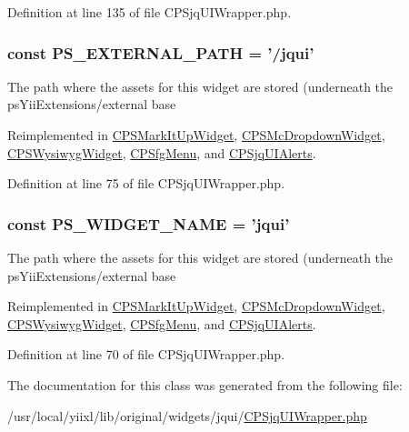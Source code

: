 Definition at line 135 of file CPSjqUIWrapper.php.

\hypertarget{classCPSjqUIWrapper_a8ccb5e1d65c091f944a6aa8c5be834ca}{
\subsubsection[{PS\_\-EXTERNAL\_\-PATH}]{\setlength{\rightskip}{0pt plus 5cm}const {\bf PS\_\-EXTERNAL\_\-PATH} = '/jqui'}}
\label{classCPSjqUIWrapper_a8ccb5e1d65c091f944a6aa8c5be834ca}
The path where the assets for this widget are stored (underneath the psYiiExtensions/external base 

Reimplemented in \hyperlink{classCPSMarkItUpWidget_a8ccb5e1d65c091f944a6aa8c5be834ca}{CPSMarkItUpWidget}, \hyperlink{classCPSMcDropdownWidget_a8ccb5e1d65c091f944a6aa8c5be834ca}{CPSMcDropdownWidget}, \hyperlink{classCPSWysiwygWidget_a8ccb5e1d65c091f944a6aa8c5be834ca}{CPSWysiwygWidget}, \hyperlink{classCPSfgMenu_a8ccb5e1d65c091f944a6aa8c5be834ca}{CPSfgMenu}, and \hyperlink{classCPSjqUIAlerts_a8ccb5e1d65c091f944a6aa8c5be834ca}{CPSjqUIAlerts}.



Definition at line 75 of file CPSjqUIWrapper.php.

\hypertarget{classCPSjqUIWrapper_ae357f9dc377f7de0d12010b2ced28cbc}{
\subsubsection[{PS\_\-WIDGET\_\-NAME}]{\setlength{\rightskip}{0pt plus 5cm}const {\bf PS\_\-WIDGET\_\-NAME} = 'jqui'}}
\label{classCPSjqUIWrapper_ae357f9dc377f7de0d12010b2ced28cbc}
The path where the assets for this widget are stored (underneath the psYiiExtensions/external base 

Reimplemented in \hyperlink{classCPSMarkItUpWidget_ae357f9dc377f7de0d12010b2ced28cbc}{CPSMarkItUpWidget}, \hyperlink{classCPSMcDropdownWidget_ae357f9dc377f7de0d12010b2ced28cbc}{CPSMcDropdownWidget}, \hyperlink{classCPSWysiwygWidget_ae357f9dc377f7de0d12010b2ced28cbc}{CPSWysiwygWidget}, \hyperlink{classCPSfgMenu_ae357f9dc377f7de0d12010b2ced28cbc}{CPSfgMenu}, and \hyperlink{classCPSjqUIAlerts_ae357f9dc377f7de0d12010b2ced28cbc}{CPSjqUIAlerts}.



Definition at line 70 of file CPSjqUIWrapper.php.



The documentation for this class was generated from the following file:\begin{DoxyCompactItemize}
\item 
/usr/local/yiixl/lib/original/widgets/jqui/\hyperlink{CPSjqUIWrapper_8php}{CPSjqUIWrapper.php}\end{DoxyCompactItemize}
